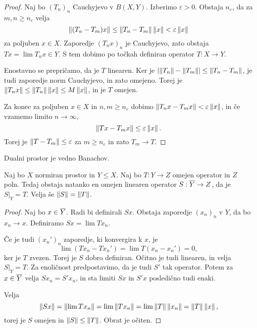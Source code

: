 \begin{proof}
  Naj bo $(T_n)_n$ Cauchyjevo v $B(X,Y)$.
  Izberimo $\varepsilon > 0$.
  Obstaja $n_\varepsilon$, da za $m, n \ge n_\varepsilon$ velja
  \[
	\left\lVert(T_n - T_m) x\right\rVert \le \left\lVert T_n - T_m\right\rVert \left\lVert x\right\rVert < \varepsilon \left\lVert x\right\rVert
  \]
  za poljuben $x \in X$.
  Zaporedje $(T_n x)_n$ je Cauchyjevo, zato obstaja $Tx = \lim T_nx \in Y$.
  S tem dobimo po točkah definiran operator $T: X \to Y$.

  Enostavno se prepričamo, da je $T$ linearen.
  Ker je $\left| \left\lVert T_n\right\rVert - \left\lVert T_m\right\rVert \right| \le \left\lVert T_n - T_m\right\rVert$, je tudi zaporedje
  norm Cauchyjevo, in zato omejeno.
  Torej je $\left\lVert T_n x\right\rVert \le \left\lVert T_n\right\rVert \left\lVert x\right\rVert \le M \left\lVert x\right\rVert$, in je $T$
  omejen.

  Za konec za poljuben $x \in X$ in $n, m \ge n_\varepsilon$ dobimo $\left\lVert T_n x
	- T_m x\right\rVert < \varepsilon \left\lVert x\right\rVert$, in če vzamemo limito $n \to \infty$,
  \[
	\left\lVert Tx - T_m x\right\rVert \le \varepsilon \left\lVert x\right\rVert.
  \]
  Torej je $\left\lVert T - T_m\right\rVert \le \varepsilon$ za $m \ge n_\varepsilon$ in zato
  $T_m \to T$.
\end{proof}

\begin{posledica}
  Dualni prostor je vedno Banachov.
\end{posledica}

\begin{izrek}
  Naj bo $X$ normiran prostor in $Y \le X$.
  Naj bo $T: Y \to Z$ omejen operator in $Z$ poln.
  Tedaj obstaja natanko en omejen linearen operator $S: \overline{Y} \to Z$, da je
  $\left. S \right|_Y = T$.
  Velja še $\left\lVert S\right\rVert = \left\lVert T\right\rVert$.
\end{izrek}

\begin{proof}
  Naj bo $x \in \overline{Y}$.
  Radi bi definirali $Sx$.
  Obstaja zaporedje $(x_n)_n$ v $Y$, da bo $x_n \to x$.
  Definiramo $Sx = \lim T x_n$.

  Če je tudi $(x_n')_n$ zaporedje, ki konvergira k $x$, je
  \[
	\lim (T x_n - T x_n') = \lim T(x_n - x_n') = 0,
  \]
  ker je $T$ zvezen.
  Torej je $S$ dobro definiran.
  Očitno je tudi linearen, in velja $\left. S \right|_Y = T$.
  Za enoličnost predpostavimo, da je tudi $S'$ tak operator.
  Potem za $x \in \overline{Y}$ velja $S x_n = S' x_n$, in sta limiti $Sx$ in $S' x$
  posledično tudi enaki.

  Velja
  \[
	\left\lVert Sx\right\rVert = \left\lVert\lim T x_n\right\rVert = \lim \left\lVert T x_n\right\rVert
	= \lim \left\lVert T\right\rVert \left\lVert x_n\right\rVert = \left\lVert T\right\rVert \left\lVert x\right\rVert,
  \]
  torej je $S$ omejen in $\left\lVert S\right\rVert \le \left\lVert T\right\rVert$.
  Obrat je očiten.
\end{proof}

